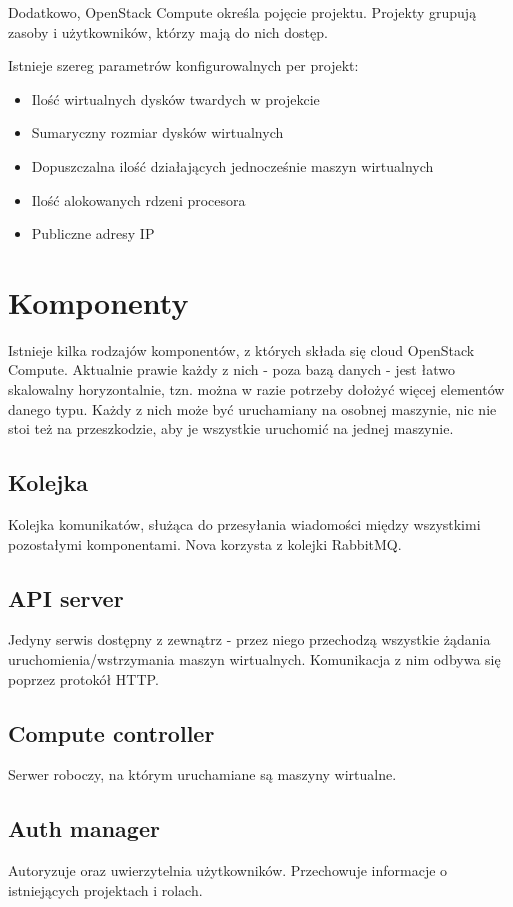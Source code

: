 \documentclass[a4paper,10pt]{article}
\begin{document}
Dodatkowo, OpenStack Compute określa pojęcie projektu. Projekty grupują zasoby i użytkowników, którzy mają do nich dostęp.

Istnieje szereg parametrów konfigurowalnych per projekt\cite{nova_manual}:

\begin{itemize}
\item Ilość wirtualnych dysków twardych w projekcie
\item Sumaryczny rozmiar dysków wirtualnych
\item Dopuszczalna ilość działających jednocześnie maszyn wirtualnych
\item Ilość alokowanych rdzeni procesora
\item Publiczne adresy IP
\end{itemize}

\section{Komponenty}

Istnieje kilka rodzajów komponentów, z których składa się cloud OpenStack Compute\cite{nova_manual}.
Aktualnie prawie każdy z nich - poza bazą danych - jest łatwo skalowalny horyzontalnie, tzn. można w razie potrzeby dołożyć więcej elementów danego typu. Każdy z nich może być uruchamiany na osobnej maszynie, nic nie stoi też na przeszkodzie, aby je wszystkie uruchomić na jednej maszynie.

\subsection{Kolejka}
Kolejka komunikatów, służąca do przesyłania wiadomości między wszystkimi pozostałymi komponentami. Nova korzysta z kolejki RabbitMQ.

\subsection{API server}
Jedyny serwis dostępny z zewnątrz - przez niego przechodzą wszystkie żądania uruchomienia/wstrzymania maszyn wirtualnych. Komunikacja z nim odbywa się poprzez protokół HTTP. 

\subsection{Compute controller}
Serwer roboczy, na którym uruchamiane są maszyny wirtualne.

\subsection{Auth manager}
Autoryzuje oraz uwierzytelnia użytkowników. Przechowuje informacje o istniejących projektach i rolach.
\end{document}
